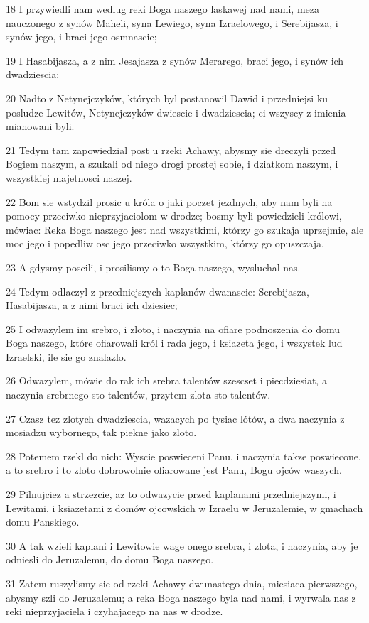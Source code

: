 \par 18 I przywiedli nam wedlug reki Boga naszego laskawej nad nami, meza nauczonego z synów Maheli, syna Lewiego, syna Izraelowego, i Serebijasza, i synów jego, i braci jego osmnascie;
\par 19 I Hasabijasza, a z nim Jesajasza z synów Merarego, braci jego, i synów ich dwadziescia;
\par 20 Nadto z Netynejczyków, których byl postanowil Dawid i przedniejsi ku posludze Lewitów, Netynejczyków dwiescie i dwadziescia; ci wszyscy z imienia mianowani byli.
\par 21 Tedym tam zapowiedzial post u rzeki Achawy, abysmy sie dreczyli przed Bogiem naszym, a szukali od niego drogi prostej sobie, i dziatkom naszym, i wszystkiej majetnosci naszej.
\par 22 Bom sie wstydzil prosic u króla o jaki poczet jezdnych, aby nam byli na pomocy przeciwko nieprzyjaciolom w drodze; bosmy byli powiedzieli królowi, mówiac: Reka Boga naszego jest nad wszystkimi, którzy go szukaja uprzejmie, ale moc jego i popedliw osc jego przeciwko wszystkim, którzy go opuszczaja.
\par 23 A gdysmy poscili, i prosilismy o to Boga naszego, wysluchal nas.
\par 24 Tedym odlaczyl z przedniejszych kaplanów dwanascie: Serebijasza, Hasabijasza, a z nimi braci ich dziesiec;
\par 25 I odwazylem im srebro, i zloto, i naczynia na ofiare podnoszenia do domu Boga naszego, które ofiarowali król i rada jego, i ksiazeta jego, i wszystek lud Izraelski, ile sie go znalazlo.
\par 26 Odwazylem, mówie do rak ich srebra talentów szescset i piecdziesiat, a naczynia srebrnego sto talentów, przytem zlota sto talentów.
\par 27 Czasz tez zlotych dwadziescia, wazacych po tysiac lótów, a dwa naczynia z mosiadzu wybornego, tak piekne jako zloto.
\par 28 Potemem rzekl do nich: Wyscie poswieceni Panu, i naczynia takze poswiecone, a to srebro i to zloto dobrowolnie ofiarowane jest Panu, Bogu ojców waszych.
\par 29 Pilnujciez a strzezcie, az to odwazycie przed kaplanami przedniejszymi, i Lewitami, i ksiazetami z domów ojcowskich w Izraelu w Jeruzalemie, w gmachach domu Panskiego.
\par 30 A tak wzieli kaplani i Lewitowie wage onego srebra, i zlota, i naczynia, aby je odniesli do Jeruzalemu, do domu Boga naszego.
\par 31 Zatem ruszylismy sie od rzeki Achawy dwunastego dnia, miesiaca pierwszego, abysmy szli do Jeruzalemu; a reka Boga naszego byla nad nami, i wyrwala nas z reki nieprzyjaciela i czyhajacego na nas w drodze.
